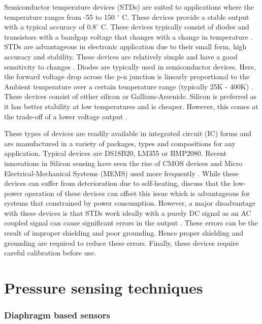 Semiconductor temperature devices (STDs) are suited to applications where the temperature ranges from -55 to 150 $^\circ$ C. These devices provide a stable output with a typical accuracy of $0.8 ^\circ $ C. These devices typically consist of diodes and transistors with a bandgap voltage that changes with a change in temperature \cite{childs2000review}. STDs are advantageous in electronic application due to their small form, high accuracy and stability. These devices are relatively simple and have a good sensitivity to changes \cite{childs2000review}. Diodes are typically used in semiconductor devices. Here, the forward voltage drop across the p-n junction is linearly proportional to the Ambient temperature over a certain temperature range (typically 25K - 400K) \cite{childs2000review}. These devices consist of either silicon or Gallium-Arsenide. Silicon is preferred as it has better stability at low temperatures and is cheaper. However, this comes at the trade-off of a lower voltage output \cite{childs2000review}. \par These types of devices are readily available in integrated circuit (IC) forms and are manufactured in a variety of packages, types and compositions for any application. Typical devices are DS18B20, LM355 or BMP2080. Recent innovations in Silicon sensing have seen the rise of CMOS devices and Micro Electrical-Mechanical Systems (MEMS) used more frequently \cite{mansoor2015silicon}. While these devices can suffer from deterioration due to self-heating, \textcite{mansoor2015silicon} discuss that the low-power operation of these devices can offset this issue which is advantageous for systems that constrained by power consumption. However, a major disadvantage with these devices is that STDs work ideally with a purely DC signal as an AC coupled signal can cause significant errors in the output \cite{childs2000review} \cite{mansoor2015silicon}. These errors can be the result of improper shielding and poor grounding. Hence proper shielding and grounding are required to reduce these errors. Finally, these devices require careful calibration before use.

\section{Pressure sensing techniques}
\subsubsection{Diaphragm based sensors}

